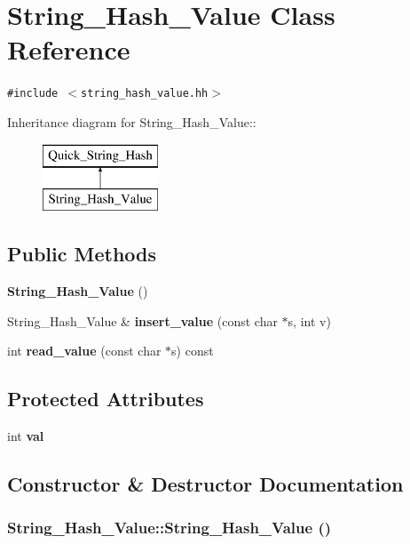 \section{String\_\-Hash\_\-Value  Class Reference}
\label{classString__Hash__Value}
{\tt \#include $<$string\_\-hash\_\-value.hh$>$}

Inheritance diagram for String\_\-Hash\_\-Value::\begin{figure}[H]
\begin{center}
\leavevmode
\includegraphics[height=2cm]{classString__Hash__Value}
\end{center}
\end{figure}
\subsection*{Public Methods}
\begin{CompactItemize}
\item 
{\bf String\_\-Hash\_\-Value} ()
\item 
String\_\-Hash\_\-Value \& {\bf insert\_\-value} (const char $\ast$s, int v)
\item 
int {\bf read\_\-value} (const char $\ast$s) const
\end{CompactItemize}
\subsection*{Protected Attributes}
\begin{CompactItemize}
\item 
int {\bf val}
\end{CompactItemize}


\subsection{Constructor \& Destructor Documentation}
\subsubsection{\setlength{\rightskip}{0pt plus 5cm}String\_\-Hash\_\-Value::String\_\-Hash\_\-Value ()\hspace{0.3cm}{\tt  [inline]}}\label{classString__Hash__Value_a0}




